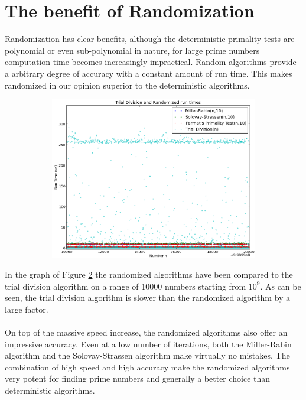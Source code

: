 \documentclass[compressed,final,notitlepage,narroweqnarray,inline,twoside,]{ieee}
\begin{document}
\section{The benefit of Randomization}
Randomization has clear benefits, although the deterministic primality tests are polynomial or even sub-polynomial in nature, for large prime numbers computation time becomes increasingly impractical. Random algorithms provide a arbitrary degree of accuracy with a constant amount of run time. This makes randomized in our opinion superior to the deterministic algorithms.
\begin{figure}
        \centering
        \begin{subfigure}[b]{0.5\textwidth}
                \includegraphics[width=\textwidth]{../images/isPrime_Randomized_runtime}
                \label{fig:gull}
        \end{subfigure}
        \vspace{-30pt}\caption{}\label{fig:rand_determinstic_comparison}
\end{figure}
In the graph of Figure \ref{fig:rand_determinstic_comparison} the randomized algorithms have been compared to the trial division algorithm on a range of 10000 numbers starting from $10^9$. As can be seen, the trial division algorithm is slower than the randomized algorithm by a large factor.\\\\ On top of the massive speed increase, the randomized algorithms also offer an impressive accuracy. Even at a low number of iterations, both the Miller-Rabin algorithm and the Solovay-Strassen algorithm make virtually no mistakes. The combination of high speed and high accuracy make the randomized algorithms very potent for finding prime numbers and generally a better choice than deterministic algorithms.

 
\end{document}
